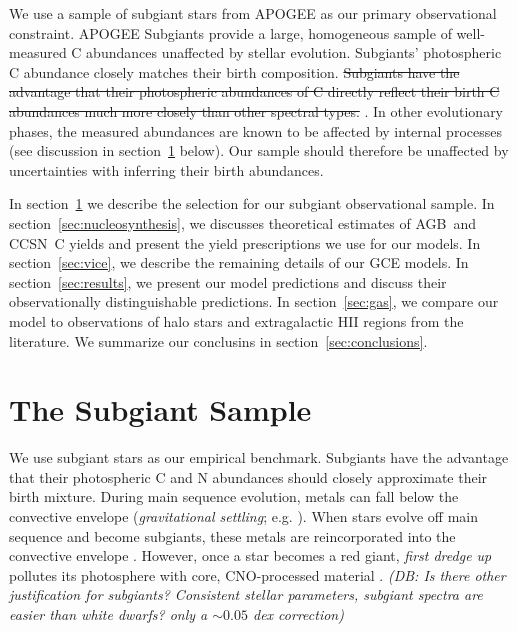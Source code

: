 \documentclass[fleqn,
usenatbib]{mnras}
\newcommand{\agb}{AGB}
\newcommand{\cc}{CCSN}
\newcommand{\strike}[1]{{\color{ForestGreen} \sout{#1}}}
\newcommand{\dbstrike}[1]{{\color{Thistle} \sout{#1} }}
\newcommand{\dbadd}[1]{{\color{Thistle} #1}}
\newcommand{\dbnote}[1]{ {\color{Thistle} \textit{\small (DB: #1)}} }
\begin{document}
We use a sample of subgiant stars from APOGEE \citep{apogee17} as our primary observational constraint.
APOGEE Subgiants provide a large, homogeneous sample of well-measured C abundances unaffected by stellar evolution.
\dbadd{Subgiants' photospheric C abundance closely matches their birth composition.}
\dbstrike{Subgiants have the advantage that their photospheric abundances of C directly reflect their birth C abundances much more closely than other spectral types.} \citep{gilroy89, korn+07, lind+08, souto+18, souto19}.
In other evolutionary phases, the measured abundances are known to be affected by internal processes (see discussion in section~\ref{sec:data_selection} below).
Our sample should therefore be unaffected by uncertainties with inferring their birth abundances.



In section~\ref{sec:data_selection} we describe the selection for our subgiant observational sample.
In section~\ref{sec:nucleosynthesis}, we discusses theoretical estimates of \agb\ and \cc\ C yields and present the yield prescriptions we use for our models.
In section~\ref{sec:vice}, we describe the remaining details of our GCE models.
In section~\ref{sec:results}, we present our model predictions and discuss their observationally distinguishable predictions. 
In section~\ref{sec:gas}, we compare our model to observations of halo stars and extragalactic HII regions from the literature. 
We summarize our conclusins in section~\ref{sec:conclusions}.







\section{The Subgiant Sample}\label{sec:data_selection}




We use subgiant stars as our empirical benchmark.
Subgiants have the advantage that their photospheric C and N abundances should closely approximate their birth mixture.
During main sequence evolution, metals can fall below the convective envelope (\textit{gravitational settling}; e.g. \citealt{turncotte+98}).
When stars evolve off main sequence and become subgiants, these metals are reincorporated into the convective envelope \citep[]{gratton+00, souto19}. 
However, once a star becomes a red giant, \textit{first dredge up} pollutes its photosphere with core, CNO-processed material
\citep{iben67, KL14}. 
\dbnote{Is there other justification for subgiants? Consistent stellar parameters, subgiant spectra are easier than white dwarfs? only a $\sim 0.05$ dex correction}
\end{document}
